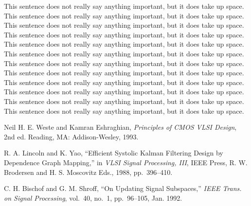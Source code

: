 \documentclass[a4paper, conference]{IEEEconf}
\begin{document}
This sentence does not really say anything important, but it does take up space.
This sentence does not really say anything important, but it does take up space.
This sentence does not really say anything important, but it does take up space.
This sentence does not really say anything important, but it does take up space.
This sentence does not really say anything important, but it does take up space.
This sentence does not really say anything important, but it does take up space.
This sentence does not really say anything important, but it does take up space.
This sentence does not really say anything important, but it does take up space.
This sentence does not really say anything important, but it does take up space.
This sentence does not really say anything important, but it does take up space.
This sentence does not really say anything important, but it does take up space.
This sentence does not really say anything important, but it does take up space.





\begin{thebibliography}{99}

   Neil H. E. Weste and Kamran Eshraghian, {\it Principles
  of CMOS VLSI Design}, 2nd ed. Reading, MA: Addison-Wesley, 1993.

   R. A. Lincoln and K. Yao, ``Efficient Systolic Kalman
  Filtering Design by Dependence Graph Mapping,'' in {\it VLSI Signal
  Processing, III}, IEEE Press, R. W. Brodersen and H. S. Moscovitz Eds.,
  1988, pp.~396--410.

   C. H. Bischof and G. M. Shroff, ``On Updating Signal
  Subspaces,'' {\it IEEE Trans. on Signal Processing}, vol.~40, no.~1,
  pp.~96--105, Jan. 1992.

\end{thebibliography}
\end{document}
